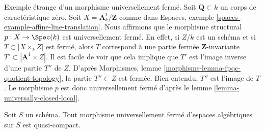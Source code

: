\begin{example}
\label{example-strange-universally-closed}
Exemple étrange d'un morphisme universellement fermé.
Soit $\mathbf{Q} \subset k$ un corps de caractéristique zéro.
Soit $X = \mathbf{A}^1_k/\mathbf{Z}$ comme dans
Espaces, exemple \ref{spaces-example-affine-line-translation}.
Nous affirmons que le morphisme structural $p : X \to \Spec(k)$
est universellement fermé.
En effet, si $Z/k$ est un schéma et si $T \subset |X \times_k Z|$ est fermé,
alors $T$ correspond à une partie fermée $\mathbf{Z}$-invariante
$T' \subset |\mathbf{A}^1 \times Z|$. Il est facile de voir que
cela implique que $T'$ est l'image inverse d'une partie $T''$ de
$Z$. D'après
Morphismes, lemme \ref{morphisms-lemma-fpqc-quotient-topology},
la partie $T'' \subset Z$ est fermée.
Bien entendu, $T''$ est l'image de $T$. Le morphisme $p$ est donc universellement
fermé d'après le lemme \ref{lemma-universally-closed-local}.
\end{example}

\begin{lemma}
\label{lemma-universally-closed-quasi-compact}
Soit $S$ un schéma.
Tout morphisme universellement fermé d'espaces algébriques sur $S$ est quasi-compact.
\end{lemma}

